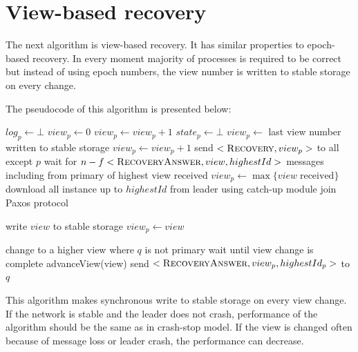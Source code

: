 \section{View-based recovery}
\label{sec:view_ss}

The next algorithm is view-based recovery. It has similar properties to epoch-based recovery. In every moment majority of processes is required to be correct but instead of using epoch numbers, the view number is written to stable storage on every change. 

The pseudocode of this algorithm is presented below: 

\begin{algorithmic}[1]
  \INIT{}
    \STATE $log_p \leftarrow \bot$
    \STATE $view_p \leftarrow 0$
      \STATE $view_p \leftarrow view_p + 1$
    \ENDIF
    \STATE $state_p \leftarrow \bot$
    \STATE
      \STATE $view_p \leftarrow$ last view number written to stable storage
        \STATE $view_p \leftarrow view_p + 1$
      \ENDIF
      \STATE send $<\recovery[], view_p>$ to all except $p$
      \STATE wait for $n-f <\recoveryAnswer[], view, highestId>$ messages including from primary of highest view received
      \STATE $view_p \leftarrow \max\{{ view \; \mathrm{received}}\}$
      \STATE download all instance up to $highestId$ from leader using catch-up module
    \ENDIF
    \STATE
    \STATE join Paxos protocol
  \ENDINIT

  \vspace{1em}
    \STATE write $view$ to stable storage
    \STATE $view_p \leftarrow view$
  \ENDPROC

  \vspace{1em}
      \STATE change to a higher view where $q$ is not primary
      \STATE wait until view change is complete
    \ENDIF
      \STATE advanceView(view)
    \ENDIF
    \STATE send $<\recoveryAnswer[], view_p, highestId_p>$ to $q$
  \ENDUPON
\end{algorithmic}

This algorithm makes synchronous write to stable storage on every view change. \linebreak If the network is stable and the leader does not crash, performance of the algorithm should be the same as in crash-stop model. If the view is changed often because of message loss or leader crash, the performance can decrease.

